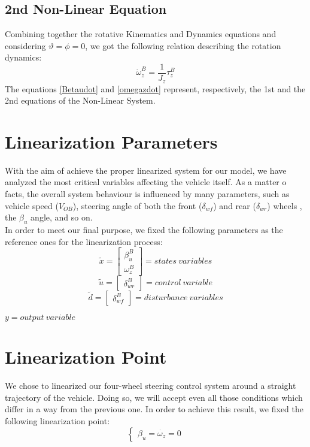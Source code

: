 \documentclass[a4paper,12pt,titlepage]{report}
\numberwithin{figure}{section}
\begin{document}
\subsection{2nd Non-Linear Equation}
	Combining together the rotative Kinematics and Dynamics equations and considering $\vartheta = \phi = 0$, we got the following relation describing the rotation dynamics:
	\begin{equation} \label{omegazdot}
		\dot{\omega}_{z}^{B} = \frac{1}{J_{z}} \tau_{z}^{B}
	\end{equation}
	The equations \ref{Betaudot} and \ref{omegazdot} represent, respectively, the 1st and the 2nd equations of the Non-Linear System.
\section{Linearization Parameters} 
	With the aim of achieve the proper linearized system for our model, we have analyzed the most critical variables affecting the vehicle itself. As a matter o facts, the overall system behaviour is influenced by many parameters, such as vehicle speed ($V_{OB}$), steering angle of both the front ($\delta_{wf}$) and rear ($\delta_{wr}$) wheels , the $\beta_{u}$ angle, and so on. \\
	In order to meet our final purpose, we fixed the following parameters as the reference ones for the linearization process:\\
		\begin{equation*}
			\tilde{x} =
			\begin{bmatrix}
			\beta_{u}^{B} \\\omega_{z}^{B}
			\end{bmatrix} = states \ variables
		\end{equation*}\quad
		\begin{equation*} 
			\tilde{u} =
			\begin{bmatrix}
			\delta_{wr}^{B} 
			\end{bmatrix} = control \ variable
		\end{equation*}\quad
		\begin{equation*} 
			\tilde{d} =
			\begin{bmatrix}
			\delta_{wf}^{B} 
			\end{bmatrix} = disturbance \ variables
		\end{equation*}
		\begin{center}
			$ y = output \ variable $	
		\end{center}
\section{Linearization Point} 
	We chose to linearized our four-wheel steering control system around a straight trajectory of the vehicle. Doing so, we will accept even all those conditions which differ in a way from the previous one. In order to achieve this result, we fixed the following linearization point:
		\begin{equation*}
			\begin{cases}
			\beta_{u} = \dot{\omega_{z}} = 0
			\end{cases}
		\end{equation*}
\end{document}

